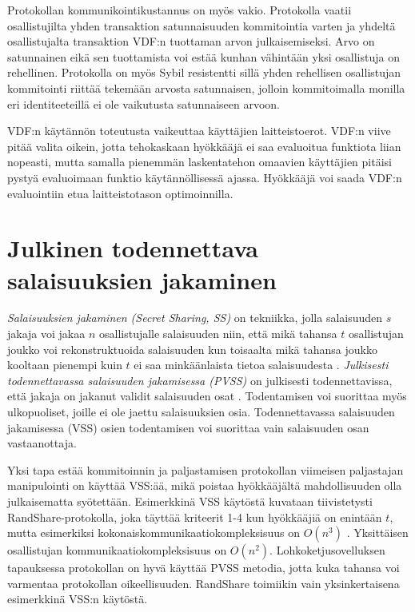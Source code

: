 Protokollan kommunikointikustannus on myös vakio. Protokolla vaatii osallistujilta yhden transaktion satunnaisuuden kommitointia varten ja yhdeltä osallistujalta transaktion VDF:n tuottaman arvon julkaisemiseksi. Arvo on satunnainen eikä sen tuottamista voi estää kunhan vähintään yksi osallistuja on rehellinen. Protokolla on myös Sybil resistentti sillä yhden rehellisen osallistujan kommitointi riittää tekemään arvosta satunnaisen, jolloin kommitoimalla monilla eri identiteeteillä ei ole vaikutusta satunnaiseen arvoon. 

VDF:n käytännön toteutusta vaikeuttaa käyttäjien laitteistoerot. VDF:n viive pitää valita oikein, jotta tehokaskaan hyökkääjä ei saa evaluoitua funktiota liian nopeasti, mutta samalla pienemmän laskentatehon omaavien käyttäjien pitäisi pystyä evaluoimaan funktio käytännöllisessä ajassa. Hyökkääjä voi saada VDF:n evaluointiin etua laitteistotason optimoinnilla.

\section{Julkinen todennettava salaisuuksien jakaminen}

\textit{Salaisuuksien jakaminen (Secret Sharing, SS)} on tekniikka, jolla salaisuuden $s$ jakaja voi jakaa $n$ osallistujalle salaisuuden niin, että mikä tahansa $t$ osallistujan joukko voi rekonstruktuoida salaisuuden kun toisaalta mikä tahansa joukko kooltaan pienempi kuin $t$ ei saa minkäänlaista tietoa salaisuudesta \cite{shamir_how_1979}. \textit{Julkisesti todennettavassa salaisuuden jakamisessa (PVSS)} on julkisesti todennettavissa, että jakaja on jakanut validit salaisuuden osat \cite{StadlerMarkus2001PVSS}. Todentamisen voi suorittaa myös ulkopuoliset, joille ei ole jaettu salaisuuksien osia. Todennettavassa salaisuuden jakamisessa (VSS) osien todentamisen voi suorittaa vain salaisuuden osan vastaanottaja.

Yksi tapa estää kommitoinnin ja paljastamisen protokollan viimeisen paljastajan manipulointi on käyttää VSS:ää, mikä poistaa hyökkääjältä mahdollisuuden olla julkaisematta syötettään. Esimerkkinä VSS käytöstä kuvataan tiivistetysti RandShare-protokolla, joka täyttää kriteerit 1-4 kun hyökkääjiä on enintään $t$, mutta esimerkiksi kokonaiskommunikaatiokompleksisuus on $O(n^3)$ \cite{syta_scalable_2017}. Yksittäisen osallistujan kommunikaatiokompleksisuus on $O(n^2)$. Lohkoketjusovelluksen tapauksessa protokollan on hyvä käyttää PVSS metodia, jotta kuka tahansa voi varmentaa protokollan oikeellisuuden. RandShare toimiikin vain yksinkertaisena esimerkkinä VSS:n käytöstä.

